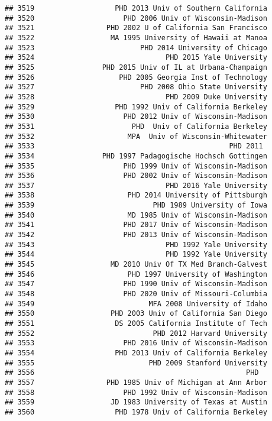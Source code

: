 \documentclass[
]{article}
\begin{document}
\begin{verbatim}
## 3519                   PHD 2013 Univ of Southern California
## 3520                     PHD 2006 Univ of Wisconsin-Madison
## 3521                 PHD 2002 U of California San Francisco
## 3522                  MA 1995 University of Hawaii at Manoa
## 3523                         PHD 2014 University of Chicago
## 3524                               PHD 2015 Yale University
## 3525                PHD 2015 Univ of IL at Urbana-Champaign
## 3526                    PHD 2005 Georgia Inst of Technology
## 3527                         PHD 2008 Ohio State University
## 3528                               PHD 2009 Duke University
## 3529                   PHD 1992 Univ of California Berkeley
## 3530                     PHD 2012 Univ of Wisconsin-Madison
## 3531                       PHD  Univ of California Berkeley
## 3532                      MPA  Univ of Wisconsin-Whitewater
## 3533                                              PHD 2011 
## 3534                PHD 1997 Padagogische Hochsch Gottingen
## 3535                     PHD 1999 Univ of Wisconsin-Madison
## 3536                     PHD 2002 Univ of Wisconsin-Madison
## 3537                               PHD 2016 Yale University
## 3538                      PHD 2014 University of Pittsburgh
## 3539                            PHD 1989 University of Iowa
## 3540                      MD 1985 Univ of Wisconsin-Madison
## 3541                     PHD 2017 Univ of Wisconsin-Madison
## 3542                     PHD 2013 Univ of Wisconsin-Madison
## 3543                               PHD 1992 Yale University
## 3544                               PHD 1992 Yale University
## 3545                  MD 2010 Univ Of TX Med Branch-Galvest
## 3546                      PHD 1997 University of Washington
## 3547                     PHD 1990 Univ of Wisconsin-Madison
## 3548                     PHD 2020 Univ of Missouri-Columbia
## 3549                           MFA 2008 University of Idaho
## 3550                  PHD 2003 Univ of California San Diego
## 3551                   DS 2005 California Institute of Tech
## 3552                            PHD 2012 Harvard University
## 3553                     PHD 2016 Univ of Wisconsin-Madison
## 3554                   PHD 2013 Univ of California Berkeley
## 3555                           PHD 2009 Stanford University
## 3556                                                  PHD  
## 3557                 PHD 1985 Univ of Michigan at Ann Arbor
## 3558                     PHD 1992 Univ of Wisconsin-Madison
## 3559                  JD 1983 University of Texas at Austin
## 3560                   PHD 1978 Univ of California Berkeley

\end{verbatim}
\end{document}
